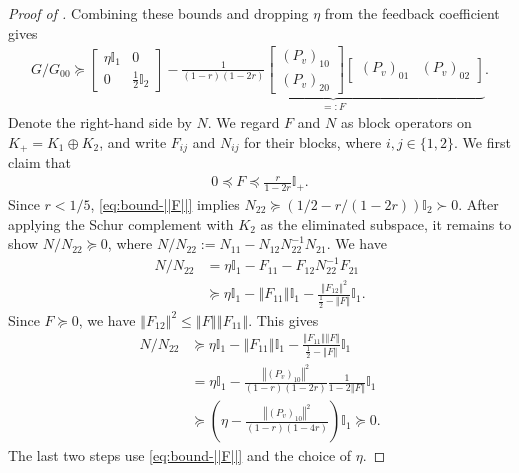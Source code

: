 \documentclass[a4paper,12pt]{article}
\theoremstyle{plain}
\theoremstyle{definition}
\newcommand{\norm}[1]{\left\Vert#1\right\Vert}
\begin{document}
\begin{proof}[Proof of ]
Combining these bounds and dropping $\eta$ from the feedback coefficient
gives
\begin{align*}
  G/G_{00} \succeq 
  \begin{bmatrix}
    \eta \mathbb{I}_1 & 0 \\
    0 & \frac{1}{2} \mathbb{I}_2
  \end{bmatrix} - \underbrace{\frac{1}{(1-r)(1-2r)}
  \begin{bmatrix}
    (P_v)_{10} \\ (P_v)_{20} 
  \end{bmatrix}
  \begin{bmatrix}
    (P_v)_{01} & (P_v)_{02} 
  \end{bmatrix} }_{=:F}.
\end{align*}
Denote the right-hand side by $N$.  We regard $F$ and $N$ as block
operators on $K_+=K_1\oplus K_2$, and
write $F_{ij}$ and $N_{ij}$ for their blocks, where $i,j\in\{1,2\}$.
We first claim that
\begin{align} \label{eq:bound-||F||}
  0 \preceq F \preceq \frac{r}{1-2r}\mathbb{I}_+.
\end{align}
Since $r<1/5$, \eqref{eq:bound-||F||} implies
$N_{22}\succeq(1/2-r/(1-2r))\mathbb{I}_2\succ0$.
  After applying the Schur complement with $K_2$ as the eliminated subspace, it
remains to show $N/N_{22}\succeq0$, where
$N/N_{22}:=N_{11}-N_{12}N_{22}^{-1}N_{21}$.  We have
\begin{align*}
  N/N_{22}
  &= \eta \mathbb{I}_1 - F_{11} - F_{12}N_{22}^{-1}F_{21} \\
  &\succeq \eta\mathbb{I}_1 - \norm{F_{11}}\mathbb{I}_1 - \frac{\norm{F_{12}}^2}{\frac{1}{2} - \norm{F}}\mathbb{I}_1.
\end{align*}
Since $F\succeq 0$, we have $\norm{F_{12}}^2 \leq \norm{F}\norm{F_{11}}$. This gives
\begin{align*}
  N/N_{22}
  &\succeq \eta\mathbb{I}_1 - \norm{F_{11}}\mathbb{I}_1 - \frac{\norm{F_{11}}\norm{F}}{\frac{1}{2} - \norm{F}}\mathbb{I}_1 \\
  &= \eta\mathbb{I}_1
  - \frac{\norm{(P_v)_{10}}^2}{(1-r)(1-2r)}
    \frac{1}{1-2\norm{F}}\mathbb{I}_1 \\ 
  &\succeq \left(\eta
    - \frac{\norm{(P_v)_{10}}^2}{(1-r)(1-4r)}\right)
    \mathbb{I}_1
  \succeq0.
\end{align*}
The last two steps use \eqref{eq:bound-||F||} and the choice of $\eta$.


\end{proof}
\end{document}
